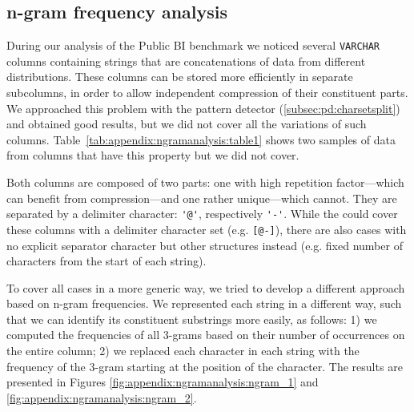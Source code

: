 

\begin{appendices}


\graphicspath{{9_appendix/images/}}




\chapter{n-gram frequency analysis}
\label{appendix:ngramanalysis}

During our analysis of the Public BI benchmark we noticed several \verb|VARCHAR| columns containing strings that are concatenations of data from different distributions. These columns can be stored more efficiently in separate subcolumns, in order to allow independent compression of their constituent parts. We approached this problem with the  pattern detector (\ref{subsec:pd:charsetsplit}) and obtained good results, but we did not cover all the variations of such columns. Table~\ref{tab:appendix:ngramanalysis:table1} shows two samples of data from columns that have this property but we did not cover.



Both columns are composed of two parts: one with high repetition factor---which can benefit from compression---and one rather unique---which cannot. They are separated by a delimiter character: \verb|'@'|, respectively \verb|'-'|. While the  could cover these columns with a delimiter character set (e.g. \verb|[@-]|), there are also cases with no explicit separator character but other structures instead (e.g. fixed number of characters from the start of each string). 

To cover all cases in a more generic way, we tried to develop a different approach based on n-gram frequencies. We represented each string in a different way, such that we can identify its constituent substrings more easily, as follows: 1) we computed the frequencies of all 3-grams based on their number of occurrences on the entire column; 2) we replaced each character in each string with the frequency of the 3-gram starting at the position of the character. The results are presented in Figures \ref{fig:appendix:ngramanalysis:ngram_1} and \ref{fig:appendix:ngramanalysis:ngram_2}.


\end{appendices}
